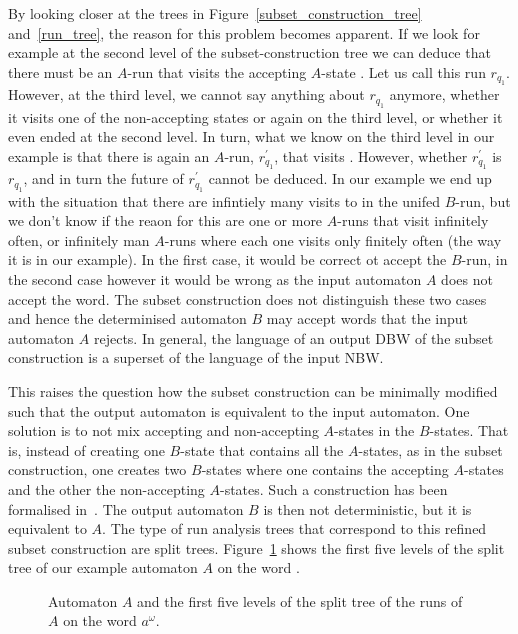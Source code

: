 By looking closer at the trees in Figure~\ref{subset_construction_tree} and~\ref{run_tree}, the reason for this problem becomes apparent. If we look for example at the second level of the subset-construction tree we can deduce that there must be an $A$-run that visits the accepting $A$-state . Let us call this run $r_{q_1}$. However, at the third level, we cannot say anything about $r_{q_1}$ anymore, whether it visits one of the non-accepting states or again  on the third level, or whether it even ended at the second level. In turn, what we know on the third level in our example is that there is again an $A$-run, $r_{q_1}^\prime$, that visits . However, whether $r_{q_1}^\prime$ is $r_{q_1}$, and in turn the future of $r_{q_1}^\prime$ cannot be deduced. In our example we end up with the situation that there are infintiely many visits to  in the unifed $B$-run, but we don't know if the reaon for this are one or more $A$-runs that visit  infinitely often, or infinitely man $A$-runs where each one visits  only finitely often (the way it is in our example). In the first case, it would be correct ot accept the $B$-run, in the second case however it would be wrong as the input automaton $A$ does not accept the word. The subset construction does not distinguish these two cases and hence the determinised automaton $B$ may accept words that the input automaton $A$ rejects. In general, the language of an output DBW of the subset construction is a superset of the language of the input NBW.

This raises the question how the subset construction can be minimally modified such that the output automaton is equivalent to the input automaton. One solution is to not mix accepting and non-accepting $A$-states in the $B$-states. That is, instead of creating one $B$-state that contains all the $A$-states, as in the subset construction, one creates two $B$-states where one contains the accepting $A$-states and the other the non-accepting $A$-states. Such a construction has been formalised in~\cite{UltesNitsche2007107}. The output automaton $B$ is then not deterministic, but it is equivalent to $A$. The type of run analysis trees that correspond to this refined subset construction are split trees. Figure~\ref{split_tree} shows the first five levels of the split tree of our example automaton $A$ on the word \aom. 

\begin{figure}
\centering
\SplitTreeRightLeft
\caption{Automaton $A$ and the first five levels of the split tree of the runs of $A$ on the word $a^\omega$.}
\label{split_tree}
\end{figure}

